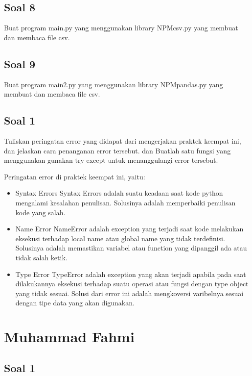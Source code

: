 \subsection{Soal 8}
Buat program main.py yang menggunakan library NPMcsv.py yang membuat dan membaca file csv.


\subsection{Soal 9}
Buat program main2.py yang menggunakan library NPMpandas.py yang membuat dan membaca file csv.


\subsection{Soal 1}
Tuliskan  peringatan  error  yang  didapat  dari  mengerjakan  praktek  keempat  ini, dan  jelaskan  cara  penanganan  error  tersebut.   dan  Buatlah  satu  fungsi  yang menggunakan gunakan try except untuk menanggulangi error tersebut.

Peringatan error di praktek keempat ini, yaitu:
\begin{itemize}
	\item Syntax Errors
	Syntax Errors adalah suatu keadaan saat kode python mengalami kesalahan penulisan. Solusinya adalah memperbaiki penulisan kode yang salah.
	
	\item Name Error
	NameError adalah exception yang terjadi saat kode melakukan eksekusi terhadap local name atau global name yang tidak terdefinisi. Solusinya adalah memastikan variabel atau function yang dipanggil ada atau tidak salah ketik.
	
	\item Type Error
	TypeError adalah exception yang akan terjadi apabila pada saat dilakukannya eksekusi terhadap suatu operasi atau fungsi dengan type object yang tidak sesuai. Solusi dari error ini adalah mengkoversi varibelnya sesuai dengan tipe data yang akan digunakan.
\end{itemize}



\section{Muhammad Fahmi}
\subsection{Soal 1}
	
